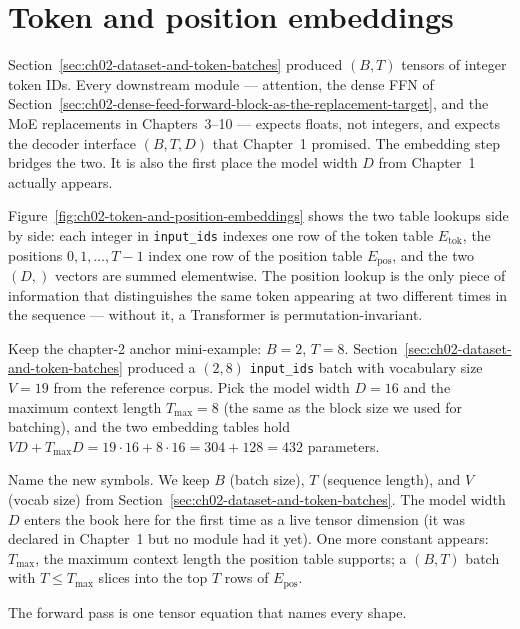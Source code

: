 \section{Token and position embeddings}
\label{sec:ch02-token-and-position-embeddings}

Section~\ref{sec:ch02-dataset-and-token-batches} produced $(B, T)$ tensors of integer token IDs. Every downstream module --- attention, the dense FFN of Section~\ref{sec:ch02-dense-feed-forward-block-as-the-replacement-target}, and the MoE replacements in Chapters~3--10 --- expects floats, not integers, and expects the decoder interface $(B, T, D)$ that Chapter~1 promised. The embedding step bridges the two. It is also the first place the model width $D$ from Chapter~1 actually appears.



Figure~\ref{fig:ch02-token-and-position-embeddings} shows the two table lookups side by side: each integer in \texttt{input\_ids} indexes one row of the token table $E_{\text{tok}}$, the positions $0, 1, \dots, T{-}1$ index one row of the position table $E_{\text{pos}}$, and the two $(D,)$ vectors are summed elementwise. The position lookup is the only piece of information that distinguishes the same token appearing at two different times in the sequence --- without it, a Transformer is permutation-invariant.

Keep the chapter-2 anchor mini-example: $B = 2$, $T = 8$. Section~\ref{sec:ch02-dataset-and-token-batches} produced a $(2, 8)$ \texttt{input\_ids} batch with vocabulary size $V = 19$ from the reference corpus. Pick the model width $D = 16$ and the maximum context length $T_{\max} = 8$ (the same as the block size we used for batching), and the two embedding tables hold $V D + T_{\max} D = 19 \cdot 16 + 8 \cdot 16 = 304 + 128 = 432$ parameters.

Name the new symbols. We keep $B$ (batch size), $T$ (sequence length), and $V$ (vocab size) from Section~\ref{sec:ch02-dataset-and-token-batches}. The model width $D$ enters the book here for the first time as a live tensor dimension (it was declared in Chapter~1 but no module had it yet). One more constant appears: $T_{\max}$, the maximum context length the position table supports; a $(B, T)$ batch with $T \le T_{\max}$ slices into the top $T$ rows of $E_{\text{pos}}$.



The forward pass is one tensor equation that names every shape.

